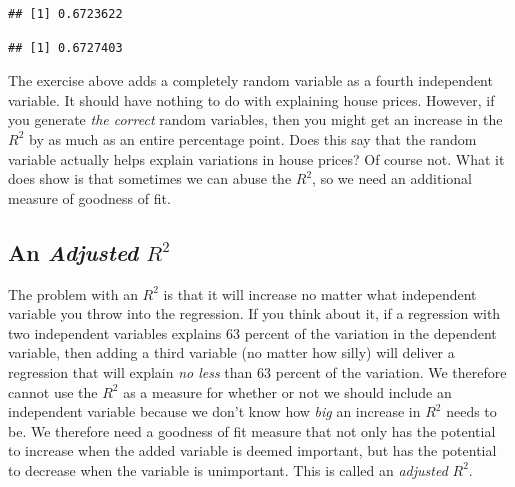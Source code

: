 \documentclass[
]{book}
\newenvironment{Shaded}{\begin{snugshade}}{\end{snugshade}}
\newcommand{\AttributeTok}[1]{\textcolor[rgb]{0.77,0.63,0.00}{#1}}
\newcommand{\FunctionTok}[1]{\textcolor[rgb]{0.00,0.00,0.00}{#1}}
\newcommand{\NormalTok}[1]{#1}
\newcommand{\OtherTok}[1]{\textcolor[rgb]{0.56,0.35,0.01}{#1}}
\newcommand{\SpecialCharTok}[1]{\textcolor[rgb]{0.00,0.00,0.00}{#1}}
\begin{document}
\begin{Shaded}
\end{Shaded}

\begin{verbatim}
## [1] 0.6723622
\end{verbatim}

\begin{Shaded}
\end{Shaded}

\begin{verbatim}
## [1] 0.6727403
\end{verbatim}

The exercise above adds a completely random variable as a fourth independent variable. It should have nothing to do with explaining house prices. However, if you generate \emph{the correct} random variables, then you might get an increase in the \(R^2\) by as much as an entire percentage point. Does this say that the random variable actually helps explain variations in house prices? Of course not. What it does show is that sometimes we can abuse the \(R^2\), so we need an additional measure of goodness of fit.

\hypertarget{an-adjusted-r2}{%
\subsection{\texorpdfstring{An \emph{Adjusted} \(R^2\)}{An Adjusted R\^{}2}}\label{an-adjusted-r2}}

The problem with an \(R^2\) is that it will increase no matter what independent variable you throw into the regression. If you think about it, if a regression with two independent variables explains 63 percent of the variation in the dependent variable, then adding a third variable (no matter how silly) will deliver a regression that will explain \emph{no less} than 63 percent of the variation. We therefore cannot use the \(R^2\) as a measure for whether or not we should include an independent variable because we don't know how \emph{big} an increase in \(R^2\) needs to be. We therefore need a goodness of fit measure that not only has the potential to increase when the added variable is deemed important, but has the potential to decrease when the variable is unimportant. This is called an \emph{adjusted} \(R^2\).
\end{document}
